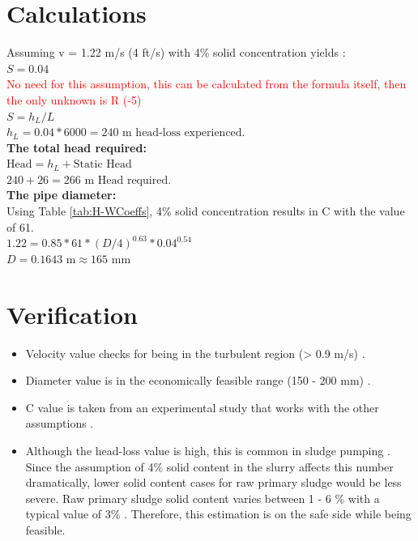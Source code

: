 \documentclass[a4paper]{article}
\begin{document}
\section*{Calculations}
Assuming v = 1.22 m/s (4 ft/s) with 4\% solid concentration yields \autocite{sanin2011}:\\
$S = 0.04$\\
\textcolor{red}{No need for this assumption, this can be calculated from the formula itself, then the only unknown is R (-5)}\\
$S = h_L/L$\\
$h_L = 0.04*6000 = 240 \text{ m head-loss experienced.}$\\
\textbf{The total head required:}\\
$\text{Head} = h_L + \text{Static Head}$\\
$240 + 26 = \boxed{266 \text{ m}} \text{ Head required.}$\\
\textbf{The pipe diameter:}\\
Using Table \ref{tab:H-WCoeffs}, 4\% solid concentration results in C with the value of 61.\\
$1.22=0.85*61*(D/4)^{0.63}*0.04^{0.54}$\\
$D = 0.1643 \text{ m} \approx \boxed{165 \text{ mm}}$
\section*{Verification}
\begin{itemize}
    \item Velocity value checks for being in the turbulent region (> 0.9 m/s) \autocite{sanin2011, metcalf2014}.
    \item Diameter value is in the economically feasible range (150 - 200 mm) \autocite{sanin2011, vesilind1988, metcalf2014}.
    \item C value is taken from an experimental study that works with the other assumptions \autocite{brisbin1957}.
    \item Although the head-loss value is high, this is common in sludge pumping \autocite{sanin2011}. Since the assumption of 4\% solid content in the slurry affects this number dramatically, lower solid content cases for raw primary sludge would be less severe. Raw primary sludge solid content varies between 1 - 6 \% with a typical value of 3\% \autocite{metcalf2014}. Therefore, this estimation is on the safe side while being feasible.
\end{itemize}
\printbibliography
\end{document}
